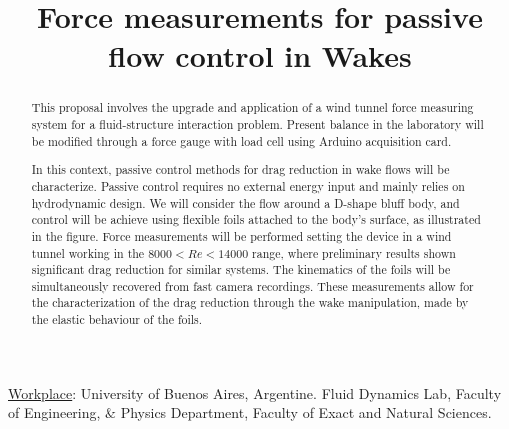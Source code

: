 \documentclass[english,12pt,a4paper]{article}
\begin{document}
	
	
	
	\title{Force measurements for passive flow control in Wakes}
	\date{}
	\maketitle
	\vspace{-1 cm}
	
	
	\begin{abstract}
		
		This proposal involves the upgrade and application of a wind tunnel  force measuring system  for a fluid-structure interaction problem. Present balance in the laboratory will be modified through a force gauge with load cell using Arduino acquisition card.
		
		In this context, passive control methods for drag reduction in wake flows will be characterize. Passive control requires no external energy input and mainly relies on  hydrodynamic design. We will consider the flow around a D-shape bluff body, and control will be achieve using flexible foils attached to the body's surface, as illustrated in the figure. Force measurements will be performed setting the device in a wind tunnel working in the $8000<Re<14000$ range, where preliminary results shown significant drag reduction for similar systems. The kinematics of the foils will be simultaneously recovered from fast camera recordings. These measurements allow for the characterization of the drag reduction through the wake manipulation, made by the elastic behaviour of the foils. 
		
		\begin{figure}[htb]
\centering\resizebox{.7\columnwidth}{!}{%
			
}
		\end{figure}
	\end{abstract}
	
	\vspace{1 cm}\noindent \underline{Workplace}: University of Buenos Aires, Argentine. Fluid Dynamics Lab, Faculty of Engineering, $\&$ Physics Department, Faculty of Exact and Natural Sciences. \\
	
\end{document}

